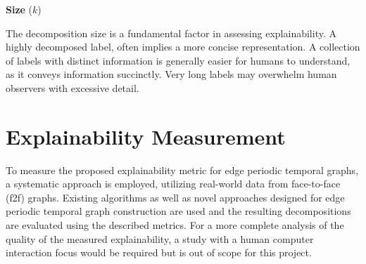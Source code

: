\textbf{Size} ($k$)

The decomposition size is a fundamental factor in assessing explainability. A highly decomposed label, often implies a more concise representation. A collection of labels with distinct information is generally easier for humans to understand, as it conveys information succinctly. Very long labels may overwhelm human observers with excessive detail.


\section{Explainability Measurement}

To measure the proposed explainability metric for edge periodic temporal graphs, a systematic approach is employed, utilizing real-world data from face-to-face (f2f) graphs. Existing algorithms as well as novel approaches designed for edge periodic temporal graph construction are used and the resulting decompositions are evaluated using the described metrics. For a more complete analysis of the quality of the measured explainability, a study with a human computer interaction focus would be required but is out of scope for this project.